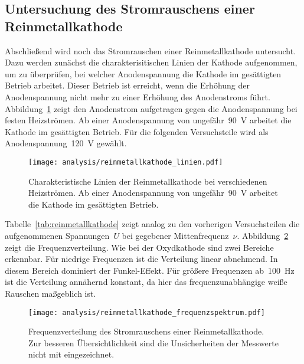 \subsection{Untersuchung des Stromrauschens einer Reinmetallkathode}

Abschließend wird noch das Stromrauschen einer Reinmetallkathode untersucht.
Dazu werden zunächst die charakterisitischen Linien der Kathode aufgenommen, um
zu überprüfen, bei welcher Anodenspannung die Kathode im gesättigten Betrieb
arbeitet. Dieser Betrieb ist erreicht, wenn die Erhöhung der Anodenspannung
nicht mehr zu einer Erhöhung des Anodenstroms führt.
Abbildung~\ref{fig:reinmetallkathode_linien} zeigt den Anodenstrom aufgetragen
gegen die Anodenspannung bei festen Heizströmen. Ab einer Anodenspannung von
ungefähr~\SI{90}{\volt} arbeitet die Kathode im gesättigten Betrieb. Für die
folgenden Versuchsteile wird als Anodenspannung~\SI{120}{\volt} gewählt.

\begin{figure}[htb]
  \centering
  \texttt{[image: analysis/reinmetallkathode\_linien.pdf]}
  \caption{Charakteristische Linien der Reinmetallkathode bei verschiedenen
  Heizströmen. Ab einer Anodenspannung von ungefähr~\SI{90}{\volt} arbeitet die
  Kathode im gesättigten Betrieb.}
  \label{fig:reinmetallkathode_linien}
\end{figure}

Tabelle~\ref{tab:reinmetallkathode} zeigt analog zu den vorherigen Versuchsteilen die
aufgenommenen Spannungen~$U$ bei gegebener Mittenfrequenz~$\nu$.
Abbildung~\ref{fig:reinmetallkathode_frequenzspektrum} zeigt die
Frequenzverteilung. Wie bei der Oxydkathode sind zwei Bereiche erkennbar. Für
niedrige Frequenzen ist die Verteilung linear abnehmend. In diesem Bereich
dominiert der Funkel-Effekt. Für größere Frequenzen ab~\SI{100}{\hertz} ist die
Verteilung annähernd konstant, da hier das frequenzunabhängige weiße Rauschen
maßgeblich ist.

\begin{figure}[htb]
  \centering
  \texttt{[image: analysis/reinmetallkathode\_frequenzspektrum.pdf]}
  \caption{Frequenzverteilung des Stromrauschens einer Reinmetallkathode. Zur
  besseren Übersichtlichkeit sind die Unsicherheiten der Messwerte nicht mit
  eingezeichnet.}
  \label{fig:reinmetallkathode_frequenzspektrum}
\end{figure}

